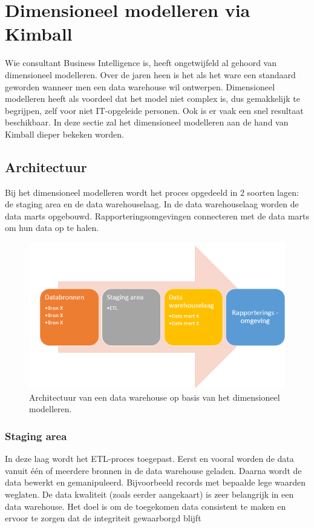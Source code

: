 \pagebreak

\section{Dimensioneel modelleren via Kimball}
Wie consultant Business Intelligence is, heeft ongetwijfeld al gehoord van dimensioneel modelleren. Over de jaren heen is het als het ware een standaard geworden wanneer men een data warehouse wil ontwerpen. Dimensioneel modelleren heeft als voordeel dat het model niet complex is, dus gemakkelijk te begrijpen, zelf voor niet IT-opgeleide personen. Ook is er vaak een snel resultaat beschikbaar. In deze sectie zal het dimensioneel modelleren aan de hand van Kimball dieper bekeken worden. 


\subsection{Architectuur}
Bij het dimensioneel modelleren wordt het proces opgedeeld in 2 soorten lagen: de staging area en de data warehouselaag. In de data warehouselaag worden de data marts opgebouwd. Rapporteringsomgevingen connecteren met de data marts om hun data op te halen.

\begin{figure}[h]
	\centering
	\includegraphics[scale=0.8]{../images/dimmodel.PNG}
	\caption{Architectuur van een data warehouse op basis van het dimensioneel modelleren.}
	\label{fig:dimmodel}
\end{figure}

\subsubsection{Staging area}
\label{sec:stagingarea}
In deze laag wordt het ETL-proces toegepast. Eerst en vooral worden de data vanuit één of meerdere bronnen in de data warehouse geladen. Daarna wordt de data bewerkt en gemanipuleerd. Bijvoorbeeld records met bepaalde lege waarden weglaten. De data kwaliteit (zoals eerder aangekaart) is zeer belangrijk in een data warehouse. Het doel is om de toegekomen data consistent te maken en ervoor te zorgen dat de integriteit gewaarborgd blijft ~\autocite{Kimball2013}

